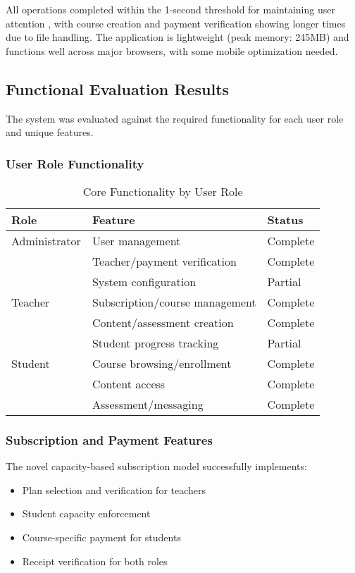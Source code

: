 All operations completed within the 1-second threshold for maintaining user attention \cite{nielsen2009}, with course creation and payment verification showing longer times due to file handling. The application is lightweight (peak memory: 245MB) and functions well across major browsers, with some mobile optimization needed.

\subsection{Functional Evaluation Results}

The system was evaluated against the required functionality for each user role and unique features.

\subsubsection{User Role Functionality}

\begin{table}[h]
\centering
\begin{tabular}{|l|l|l|}
\hline
\textbf{Role} & \textbf{Feature} & \textbf{Status} \\
\hline
Administrator & User management & Complete \\
 & Teacher/payment verification & Complete \\
 & System configuration & Partial \\
\hline
Teacher & Subscription/course management & Complete \\
 & Content/assessment creation & Complete \\
 & Student progress tracking & Partial \\
\hline
Student & Course browsing/enrollment & Complete \\
 & Content access & Complete \\
 & Assessment/messaging & Complete \\
\hline
\end{tabular}
\caption{Core Functionality by User Role}
\label{tab:functionality}
\end{table}

\subsubsection{Subscription and Payment Features}

The novel capacity-based subscription model successfully implements:

\begin{itemize}
    \item Plan selection and verification for teachers
    \item Student capacity enforcement
    \item Course-specific payment for students
    \item Receipt verification for both roles
\end{itemize}

